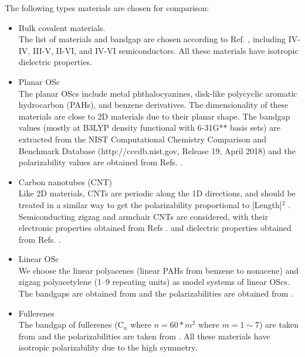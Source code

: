 \documentclass[manuscript=suppinfo,email=true,hyperref=true,keywords=false]{achemso}
\begin{document}
The following types materials are chosen for comparison:
\begin{itemize}
\item Bulk covalent materials.  \\
  The list of materials and bandgap are chosen according to
  Ref. , including IV-IV, III-V, II-VI, and
  IV-VI semiconductors. All these materials have isotropic dielectric
  properties.
\item Planar OSc \\
  The planar OScs include metal phthalocyanines, disk-like polycyclic
  aromatic hydrocarbon (PAHs), and benzene derivatives. The
  dimensionality of these materials are close to 2D materials due to
  their planar shape. The bandgap values (mostly at B3LYP density
  functional with 6-31G** basis sets) are extracted from the NIST
  Computational Chemistry Comparison and Benchmark Database
  (http://cccdb.nist.gov, Release 19, April 2018) and the
  polarizability values are obtained from
  Refs. .
\item Carbon nanotubes (CNT) \\
  Like 2D materials, CNTs are periodic along the 1D directions, and
  should be treated in a similar way to get the polarizability
  proportional to [Length]$^{2}$ \cite{Benedict_1995}. Semiconducting
  zigzag and armchair CNTs are considered, with their electronic
  properties obtained from Refs
  . and dielectric properties
  obtained from
  Refs. .
\item Linear OSc \\
  We choose the linear polyacenes (linear PAHs from benzene to
  nonacene) and zigzag polyacetylene (1--9 repeating units) as model
  systems of linear OScs. The bandgaps are obtained from
   and the polarizabilities are obtained from
  .
\item Fullerenes \\
  The bandgap of fullerenes (C$_{n}$ where $n=60*m^{2}$ where
  $m=1\sim{}7$) are taken from  and the
  polarizabilities are taken from . All these
  materials have isotropic polarizability due to the high symmetry.
\end{itemize}
\end{document}
